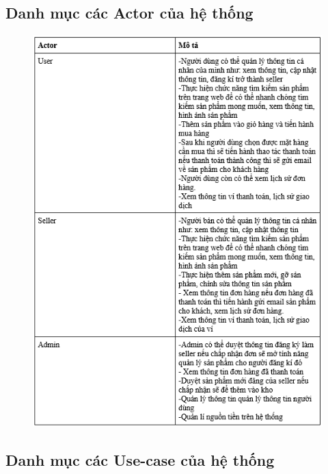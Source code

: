 \documentclass{article}
\begin{document}
\subsection{Danh mục các Actor của hệ thống}
\begin{center}
	\begin{figure}[htp]
		\begin{center}
			\includegraphics{anh3.png}
			
		\end{center}
		
		
	\end{figure}
\end{center}
\newpage
\subsection{Danh mục các Use-case của hệ thống}
\end{document}

